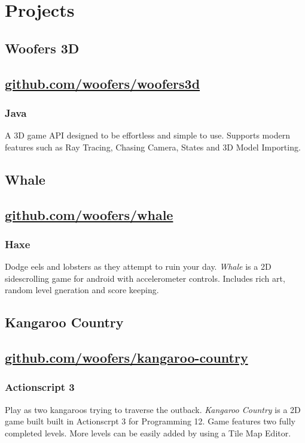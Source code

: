 \documentclass[letterpaper]{article}
\date{}
\title{}
\begin{document}

\section{Projects}
\label{sec-1}
\subsection{Woofers 3D}
\label{sec-1-1}
\subsection{\href{https://github.com/woofers/woofers3d}{github.com/woofers/woofers3d}}
\label{sec-1-2}
\subsubsection{Java}
\label{sec-1-2-1}
A 3D game API designed to be effortless and simple to use.
Supports modern features such as Ray Tracing, Chasing Camera, States and 3D Model Importing.
\subsection{Whale}
\label{sec-1-3}
\subsection{\href{https://github.com/woofers/whale}{github.com/woofers/whale}}
\label{sec-1-4}
\subsubsection{Haxe}
\label{sec-1-4-1}
Dodge eels and lobsters as they attempt to ruin your day.
\emph{Whale} is a 2D sidescrolling game for android with accelerometer controls.  Includes rich art, random level gneration and score keeping.
\subsection{Kangaroo Country}
\label{sec-1-5}
\subsection{\href{https://github.com/woofers/kangaroo-country}{github.com/woofers/kangaroo-country}}
\label{sec-1-6}
\subsubsection{Actionscript 3}
\label{sec-1-6-1}
Play as two kangaroos trying to traverse the outback.
\emph{Kangaroo Country} is a 2D game built built in Actionscrpt 3 for Programming 12. Game features two fully completed levels. More levels can be easily added by using a Tile Map Editor.
\end{document}
